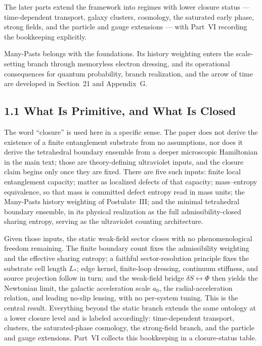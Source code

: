 \documentclass[11pt]{article}
\begin{document}
The later parts extend the framework into regimes with lower closure status --- time-dependent transport, galaxy clusters, cosmology, the saturated early phase, strong fields, and the particle and gauge extensions --- with Part~VI recording the bookkeeping explicitly.

Many-Pasts belongs with the foundations. Its history weighting enters the scale-setting branch through memoryless electron dressing, and its operational consequences for quantum probability, branch realization, and the arrow of time are developed in Section~21 and Appendix~G.

\subsection{1.1 What Is Primitive, and What Is Closed}

The word ``closure'' is used here in a specific sense. The paper does not derive the existence of a finite entanglement substrate from no assumptions, nor does it derive the tetrahedral boundary ensemble from a deeper microscopic Hamiltonian in the main text; those are theory-defining ultraviolet inputs, and the closure claim begins only once they are fixed. There are five such inputs: finite local entanglement capacity; matter as localized defects of that capacity; mass--entropy equivalence, so that mass is committed defect entropy read in mass units; the Many-Pasts history weighting of Postulate~III; and the minimal tetrahedral boundary ensemble, in its physical realization as the full admissibility-closed sharing entropy, serving as the ultraviolet counting architecture.

Given those inputs, the static weak-field sector closes with no phenomenological freedom remaining. The finite boundary count fixes the admissibility weighting and the effective sharing entropy; a faithful sector-resolution principle fixes the substrate cell length $L_*$; edge kernel, finite-loop dressing, continuum stiffness, and source projection follow in turn; and the weak-field bridge $\delta S\leftrightarrow\Phi$ then yields the Newtonian limit, the galactic acceleration scale $a_0$, the radial-acceleration relation, and leading no-slip lensing, with no per-system tuning. This is the central result. Everything beyond the static branch extends the same ontology at a lower closure level and is labeled accordingly: time-dependent transport, clusters, the saturated-phase cosmology, the strong-field branch, and the particle and gauge extensions. Part~VI collects this bookkeeping in a closure-status table.
\end{document}
